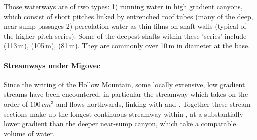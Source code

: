  Those waterways are of two types: 1) running water in high gradient canyons, which consist of short pitches linked by entrenched roof tubes (many of the deep, near-sump passages 2) percolation water as thin films on shaft walls (typical of the higher pitch series). Some of the deepest shafts within these `series' include  (113\,m),  (105\,m),  (81\,m). They are commonly over 10\,m in diameter at the base. 
 



\paragraph{Streamways under Migovec} Since the writing of the Hollow Mountain, some locally extensive, low gradient streams have been encountered, in particular the  streamway which takes on the order of $100\,cm^3$ and flows northwards, linking with  and . Together these stream sections make up the longest continuous streamway within , at a substantially lower gradient than the deeper near-sump canyon, which take a comparable volume of water. 
 
